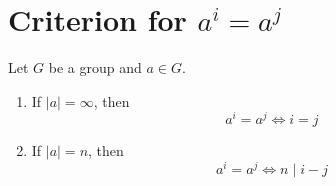 \section{Criterion for \(a^i = a^j\)}

\begin{theorem}[Criterion for \(a^i = a^j\)]
    Let \(G\) be a group and \(a \in G\).
    \begin{enumerate}
        \item If \(|a| = \infty\), then 
            \[
                a^i = a^j \iff i = j
            \]
        \item If \(|a| = n\), then
            \[
                a^i = a^j \iff n \mid i-j
            \]
    \end{enumerate}
\end{theorem}

